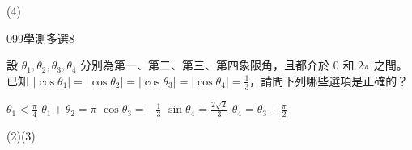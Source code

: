 \begin{QUESTIONS}
\begin{QUESTION}
\begin{QBODY}
        \end{QBODY}
        \begin{QFROMS}
        \end{QFROMS}
        \begin{QTAGS}\end{QTAGS}
        \begin{QANS}
            (4)
        \end{QANS}
        \begin{QSOLLIST}
        \end{QSOLLIST}
        \begin{QEMPTYSPACE}
        \end{QEMPTYSPACE}
    \end{QUESTION}
\end{QUESTIONS}
\begin{QUESTIONS}
    \begin{QUESTION}
        \begin{ExamInfo}{099}{學測}{多選}{8}
        \end{ExamInfo}
        \begin{ExamAnsRateInfo}{39}{72}{29}{16}
        \end{ExamAnsRateInfo}
        \begin{QBODY}
			設 $\theta_1,\theta_2,\theta_3,\theta_4$ 分別為第一、第二、第三、第四象限角，且都介於 $0$ 和  $2\pi$ 之間。已知 $|\cos \theta_{1}| =|\cos \theta_{2}| =|\cos \theta_{3}| =|\cos \theta_{4}| =\frac{1}{3}$，請問下列哪些選項是正確的？
			\begin{QOPS} 
				\QOP $\theta_{1} < \frac{\pi}{4}$ 
				\QOP $\theta_{1} + \theta_{2} = \pi$
				\QOP $ \cos \theta_{3}  =-\frac{1}{3}$ 
				\QOP $\sin\theta_{4} = \frac{2\sqrt{2}}{3}$
				\QOP $\theta_{4} = \theta_{3} + \frac{\pi}{2}$ 
			\end{QOPS}
        \end{QBODY}
        \begin{QFROMS}
        \end{QFROMS}
        \begin{QTAGS}\end{QTAGS}
        \begin{QANS}
            (2)(3)
        \end{QANS}
        \begin{QSOLLIST}
        \end{QSOLLIST}
        \begin{QEMPTYSPACE}
        \end{QEMPTYSPACE}
    \end{QUESTION}

\end{QUESTIONS}
